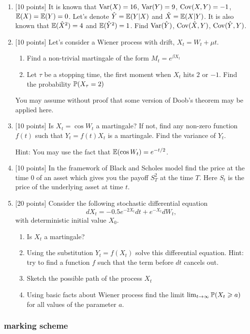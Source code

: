 \documentclass[pdftex,12pt,a4paper]{article}
\begin{document}
\begin{enumerate}
\item $[$10 points] It is known that $\Var(X)=16$, $\Var(Y)=9$, $\Cov(X,Y)=-1$, $\E(X)=\E(Y)=0$. Let's denote $\hat{Y}=\E(Y|X)$ and $\hat{X}=\E(X|Y)$. It is also known that $\E(\hat{X}^2)=4$ and $\E(\hat{Y}^2)=1$.  Find $\Var(\hat{Y})$, $\Cov(\hat{X},Y)$, $\Cov(\hat{Y},Y)$.
\item $[$10 points] Let's consider a Wiener process with drift, $X_t=W_t+\mu t$. 
\begin{enumerate}
\item Find a non-trivial martingale of the form $M_t=e^{\beta X_t}$
\item Let $\tau$ be a stopping time, the first moment when $X_t$ hits $2$ or $-1$. Find the probability $\P(X_\tau=2)$
\end{enumerate}
You may assume without proof that some version of Doob's theorem may be applied here.
\item $[$10 points] Is $X_t=\cos W_t$ a martingale? If not, find any non-zero function $f(t)$ such that $Y_t=f(t)X_t$ is a martingale. Find the variance of $Y_t$.

Hint: You may use the fact that $\E(\cos W_t)=e^{-t/2}$.

\item $[$10 points] In the framework of Black and Scholes model find the price at the time $0$ of an asset which gives you the payoff $S_T^2$ at the time $T$. Here $S_t$ is the price of the underlying asset at time $t$.
\item $[$20 points] Consider the following stochastic differential equation
\[
dX_t=-0.5e^{-2X_t}dt+e^{-X_t}dW_t,
\]
with deterministic initial value $X_0$.
\begin{enumerate}
\item Is $X_t$ a martingale?
\item Using the substitution $Y_t=f(X_t)$ solve this differential equation. Hint: try to find a function $f$ such that the term before $dt$ cancels out.
\item Sketch the possible path of the process $X_t$
\item Using basic facts about Wiener process find the limit $\lim_{t\to\infty} \P(X_t \geq a)$ for all values of the parameter $a$.
\end{enumerate}

\end{enumerate}

\subsubsection*{marking scheme}
\end{document}
